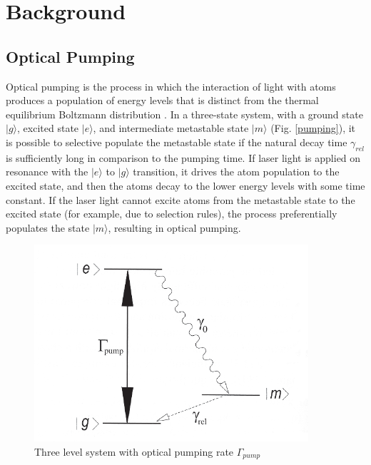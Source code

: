 
\section{Background}\label{background}

\subsection{Optical Pumping}\label{opticalpumping}

Optical pumping is the process in which the interaction of light with
atoms produces a population of energy levels that is distinct from the
thermal equilibrium Boltzmann distribution \cite{bernheim}. In a
three-state system, with a ground state $|g\rangle$, excited state
$|e\rangle$, and intermediate metastable state $|m\rangle$
(Fig. \ref{pumping}), it is possible to selective populate the metastable
state if the natural decay time $\gamma_{rel}$ is sufficiently long in
comparison to the pumping time. If laser light is applied on resonance
with the $|e\rangle$ to $|g\rangle$ transition, it drives the atom
population to the excited state, and then the atoms decay to the lower
energy levels with some time constant. If the laser light cannot
excite atoms from the metastable state to the excited state (for
example, due to selection rules), the process preferentially populates
the state $|m\rangle$, resulting in optical pumping.


\begin{figure}[h]
\begin{center}
\includegraphics[width=4in]{figures/pumping.eps}
\caption{\small{Three level system with optical pumping rate $\Gamma_{pump}$}}
\label{fig:pumping}
\end{center}
\end{figure}


